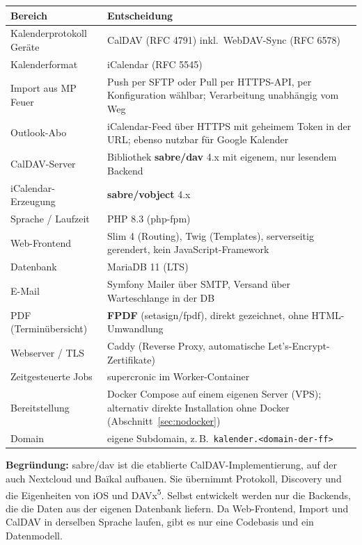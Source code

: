 \documentclass[a4paper,fontsize=10pt]{scrartcl}
\newcommand{\code}[1]{\texttt{#1}}
\begin{document}
\begin{center}
\begin{tabularx}{\textwidth}{L{4.2cm}X}
\toprule
\textbf{Bereich} & \textbf{Entscheidung} \\
\midrule
Kalenderprotokoll Geräte & CalDAV (RFC 4791) inkl.\ WebDAV-Sync (RFC 6578) \\
Kalenderformat & iCalendar (RFC 5545) \\
Import aus MP Feuer & Push per SFTP oder Pull per HTTPS-API, per
               Konfiguration wählbar; Verarbeitung unabhängig vom Weg \\
Outlook-Abo & iCalendar-Feed über HTTPS mit geheimem Token in der URL;
               ebenso nutzbar für Google Kalender \\
CalDAV-Server & Bibliothek \textbf{sabre/dav} 4.x mit eigenem, nur lesendem
               Backend \\
iCalendar-Erzeugung & \textbf{sabre/vobject} 4.x \\
Sprache / Laufzeit & PHP 8.3 (php-fpm) \\
Web-Frontend & Slim 4 (Routing), Twig (Templates), serverseitig gerendert,
               kein JavaScript-Framework \\
Datenbank & MariaDB 11 (LTS) \\
E-Mail & Symfony Mailer über SMTP, Versand über Warteschlange in der DB \\
PDF (Terminübersicht) & \textbf{FPDF} (setasign/fpdf), direkt gezeichnet,
               ohne HTML-Umwandlung \\
Webserver / TLS & Caddy (Reverse Proxy, automatische Let's-Encrypt-Zertifikate) \\
Zeitgesteuerte Jobs & supercronic im Worker-Container \\
Bereitstellung & Docker Compose auf einem eigenen Server (VPS); alternativ
               direkte Installation ohne Docker (Abschnitt~\ref{sec:nodocker}) \\
Domain & eigene Subdomain, z.\,B.\ \code{kalender.<domain-der-ff>} \\
\bottomrule
\end{tabularx}
\end{center}

\textbf{Begründung:} sabre/dav ist die etablierte CalDAV-Implementierung,
auf der auch Nextcloud und Baïkal aufbauen. Sie übernimmt Protokoll,
Discovery und die Eigenheiten von iOS und DAVx\textsuperscript{5}. Selbst
entwickelt werden nur die Backends, die die Daten aus der eigenen Datenbank
liefern. Da Web-Frontend, Import und CalDAV in derselben Sprache laufen, gibt
es nur eine Codebasis und ein Datenmodell.
\end{document}
